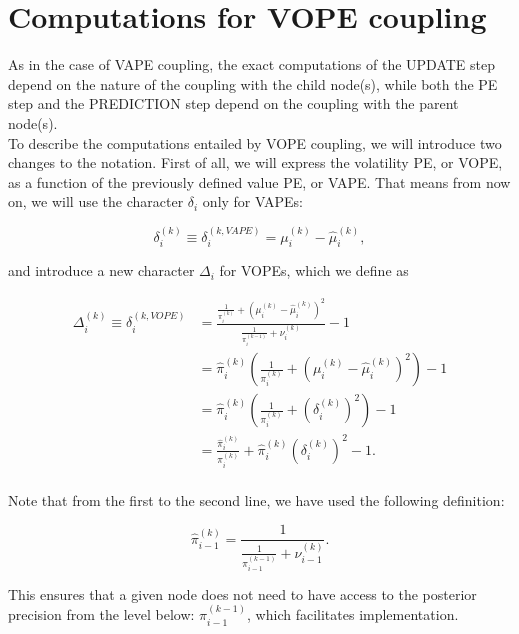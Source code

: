 \section{Computations for VOPE coupling}
As in the case of \textsf{VAPE} coupling, the exact computations of the \textsf{UPDATE step} depend on the nature of the coupling with the child node(s), while both the \textsf{PE step} and the \textsf{PREDICTION step} depend on the coupling with the parent node(s).\\

To describe the computations entailed by \textsf{VOPE} coupling, we will introduce two changes to the notation. First of all, we will express the volatility PE, or \textsf{VOPE}, as a function of the previously defined value PE, or \textsf{VAPE}. That means from now on, we will use the character $\delta_i$ only for \textsf{VAPE}s:

\begin{equation}
	\delta_i^{(k)} \equiv \delta_i^{(k, VAPE)} = \mu_i^{(k)} - \hat{\mu}_i^{(k)},
\end{equation}

and introduce a new character $\Delta_i$ for \textsf{VOPE}s, which we define as 

\begin{equation}
  \begin{split}
    \Delta_i^{(k)} \equiv \delta_i^{(k, VOPE)} &= \frac{ \frac{1}{\pi_{i}^{(k)}} + (\mu_i^{(k)} - \hat{\mu}_i^{(k)})^2 }{ \frac{1}{\pi_{i}^{(k-1)}} + \nu_{i}^{(k)} } - 1 \\
    &= \hat{\pi}_i^{(k)} \left( \frac{1}{\pi_{i}^{(k)}} + (\mu_i^{(k)} - \hat{\mu}_i^{(k)})^2 \right) - 1 \\
    &= \hat{\pi}_i^{(k)} \left( \frac{1}{\pi_{i}^{(k)}} + (\delta_i^{(k)})^2 \right) - 1 \\
    &=  \frac{\hat{\pi}_i^{(k)}}{\pi_{i}^{(k)}} + \hat{\pi}_i^{(k)} (\delta_i^{(k)})^2 - 1. \\
  \end{split} 
\end{equation}

Note that from the first to the second line, we have used the following definition:

\begin{equation*}
\hat{\pi}_{i-1}^{(k)} = \frac{1}{ \frac{1}{\pi_{i-1}^{(k-1)}} + \nu_{i-1}^{(k)} }.
\end{equation*}

This ensures that a given node does not need to have access to the posterior precision from the level below: $\pi_{i-1}^{(k-1)}$, which facilitates implementation.\\


